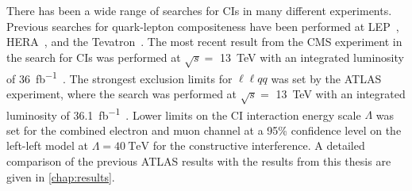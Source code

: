 There has been a wide range of searches for CIs in many different experiments. Previous searches for quark-lepton compositeness have been performed at LEP~\cite{Schael:2006wu,Abdallah:2005ph}, HERA~\cite{Wing:2013sv,Chekanov:2003pw}, and the Tevatron~\cite{Orejudos:2002ua,Abbott:1998rr}. The most recent result from the CMS experiment in the search for CIs was performed at $\sqrt{s} = $ \SI{13}{\tera\electronvolt} with an integrated luminosity of \SI{36}{\femto\barn^{-1}}~\cite{Sirunyan:2018ipj}. The strongest exclusion limits for $\ell\ell qq$ was set by the ATLAS experiment, where the search was performed at $\sqrt{s} = $ \SI{13}{\tera\electronvolt} with an integrated luminosity of \SI{36.1}{\femto\barn^{-1}}~\cite{EXOT-2016-05}. Lower limits on the CI interaction energy scale $\Lambda$ was set for the combined electron and muon channel at a 95\% confidence level on the left-left model at $\Lambda = \SI{40}{\tera\electronvolt}$ for the constructive interference. A detailed comparison of the previous ATLAS results with the results from this thesis are given in \cref{chap:results}.


